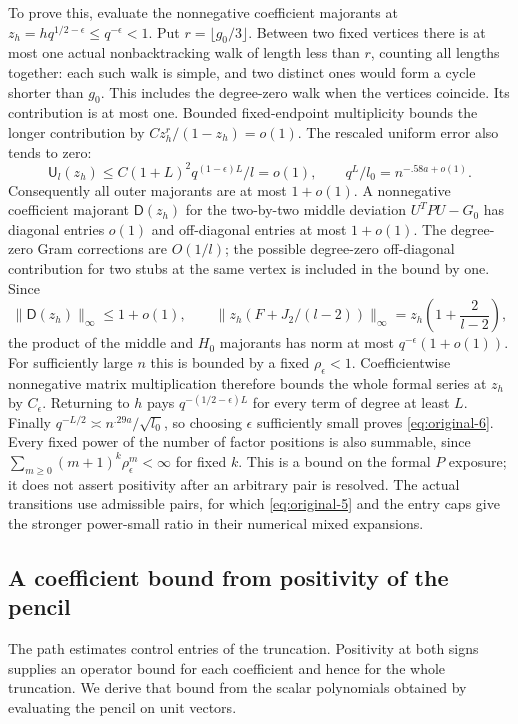 To prove this, evaluate the nonnegative coefficient majorants at
$z_h=hq^{1/2-\epsilon}\le q^{-\epsilon}<1$. Put
$r=\lfloor g_0/3\rfloor$. Between two fixed vertices there is at most
one actual nonbacktracking walk of length less than $r$, counting all
lengths together: each such walk is simple, and two distinct ones would
form a cycle shorter than $g_0$. This includes the degree-zero walk
when the vertices coincide. Its contribution is at most one. Bounded
fixed-endpoint multiplicity bounds the longer contribution by
$Cz_h^r/(1-z_h)=o(1)$. The rescaled uniform error also tends to zero:
\[
 \mathsf U_l(z_h)\le C(1+L)^2q^{(1-\epsilon)L}/l=o(1),
 \qquad q^L/l_0=n^{-.58a+o(1)}.
\]
Consequently all outer majorants are at most $1+o(1)$. A nonnegative
coefficient majorant $\mathsf D(z_h)$ for the two-by-two middle
deviation $U^TPU-G_0$ has diagonal entries $o(1)$ and off-diagonal
entries at most $1+o(1)$. The degree-zero Gram corrections are $O(1/l)$;
the possible degree-zero off-diagonal contribution for two stubs at the
same vertex is included in the bound by one. Since
\[
 \|\mathsf D(z_h)\|_\infty\le1+o(1),\qquad
 \bigl\lVert z_h(F+J_2/(l-2))\bigr\rVert_\infty
 =z_h\left(1+\frac2{l-2}\right),
\]
the product of the middle and $H_0$ majorants has norm at most
$q^{-\epsilon}(1+o(1))$. For sufficiently large $n$ this is bounded
by a fixed $\rho_\epsilon<1$. Coefficientwise nonnegative matrix
multiplication therefore bounds the whole formal series at $z_h$ by
$C_\epsilon$. Returning to $h$ pays
$q^{-(1/2-\epsilon)L}$ for every term of degree at least $L$.
Finally $q^{-L/2}\asymp n^{.29a}/\sqrt{l_0}$, so choosing
$\epsilon$ sufficiently small proves \eqref{eq:original-6}.
Every fixed power of the number of factor positions is also summable,
since $\sum_{m\ge0}(m+1)^k\rho_\epsilon^m<\infty$ for fixed $k$.
This is a bound on the formal $P$ exposure; it does not assert positivity
after an arbitrary pair is resolved. The actual transitions use
admissible pairs, for which \eqref{eq:original-5} and the entry caps give
the stronger power-small ratio in their numerical mixed expansions.

\subsection{A coefficient bound from positivity of the pencil}

The path estimates control entries of the truncation. Positivity at
both signs supplies an operator bound for each coefficient and hence
for the whole truncation. We derive that bound from the scalar
polynomials obtained by evaluating the pencil on unit vectors.

